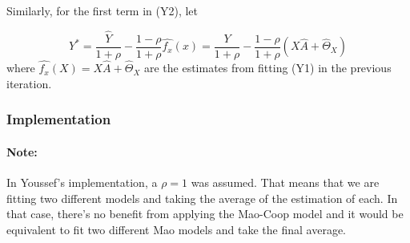 \documentclass[
]{article}
\begin{document}
Similarly, for the first term in (Y2), let

\[Y^* = \frac{\hat Y}{1+\rho} - \frac{1-\rho}{1+\rho}\hat {f_x}(x) = \frac{Y}{1+\rho} - \frac{1-\rho}{1+\rho}(X\hat{A}+\hat{\Theta}_X)\]
where \(\hat {f_x}(X) = X\hat{A}+\hat{\Theta}_X\) are the estimates from
fitting (Y1) in the previous iteration.

\hypertarget{implementation}{%
\subsubsection{Implementation}\label{implementation}}

\hypertarget{note}{%
\paragraph{Note:}\label{note}}

In Youssef's implementation, a \(\rho=1\) was assumed. That means that
we are fitting two different models and taking the average of the
estimation of each. In that case, there's no benefit from applying the
Mao-Coop model and it would be equivalent to fit two different Mao
models and take the final average.
\end{document}

